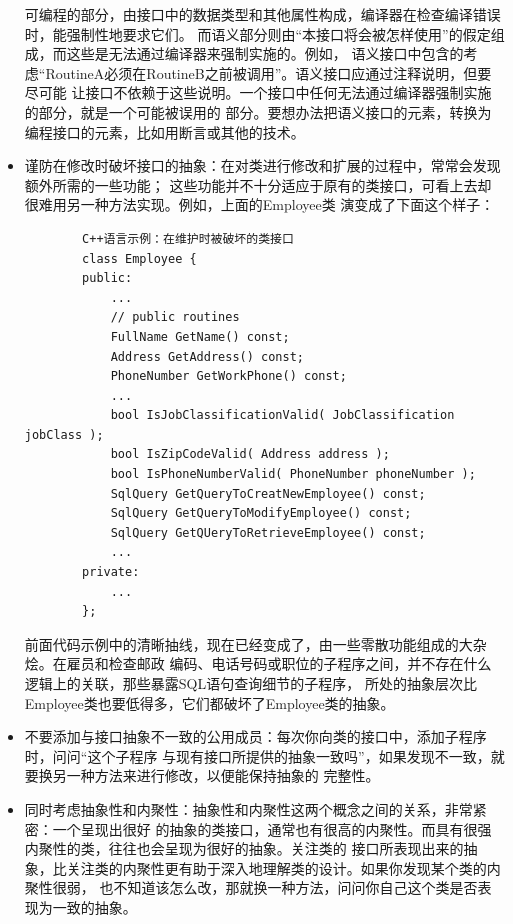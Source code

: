 \documentclass{article}
\begin{document}
\begin{itemize}
    可编程的部分，由接口中的数据类型和其他属性构成，编译器在检查编译错误时，能强制性地要求它们。
    而语义部分则由“本接口将会被怎样使用”的假定组成，而这些是无法通过编译器来强制实施的。例如，
    语义接口中包含的考虑“RoutineA必须在RoutineB之前被调用”。语义接口应通过注释说明，但要尽可能
    让接口不依赖于这些说明。一个接口中任何无法通过编译器强制实施的部分，就是一个可能被误用的
    部分。要想办法把语义接口的元素，转换为编程接口的元素，比如用断言或其他的技术。
    \item 谨防在修改时破坏接口的抽象：在对类进行修改和扩展的过程中，常常会发现额外所需的一些功能；
    这些功能并不十分适应于原有的类接口，可看上去却很难用另一种方法实现。例如，上面的Employee类
    演变成了下面这个样子：
    \begin{lstlisting}
        C++语言示例：在维护时被破坏的类接口
        class Employee {
        public:
            ...
            // public routines
            FullName GetName() const;
            Address GetAddress() const;
            PhoneNumber GetWorkPhone() const;
            ...
            bool IsJobClassificationValid( JobClassification jobClass );
            bool IsZipCodeValid( Address address );
            bool IsPhoneNumberValid( PhoneNumber phoneNumber );
            SqlQuery GetQueryToCreatNewEmployee() const;
            SqlQuery GetQueryToModifyEmployee() const;
            SqlQuery GetQUeryToRetrieveEmployee() const;
            ... 
        private:
            ...
        };
    \end{lstlisting}
    前面代码示例中的清晰抽线，现在已经变成了，由一些零散功能组成的大杂烩。在雇员和检查邮政
    编码、电话号码或职位的子程序之间，并不存在什么逻辑上的关联，那些暴露SQL语句查询细节的子程序，
    所处的抽象层次比Employee类也要低得多，它们都破坏了Employee类的抽象。
    \item 不要添加与接口抽象不一致的公用成员：每次你向类的接口中，添加子程序时，问问“这个子程序
    与现有接口所提供的抽象一致吗”，如果发现不一致，就要换另一种方法来进行修改，以便能保持抽象的
    完整性。
    \item 同时考虑抽象性和内聚性：抽象性和内聚性这两个概念之间的关系，非常紧密：一个呈现出很好
    的抽象的类接口，通常也有很高的内聚性。而具有很强内聚性的类，往往也会呈现为很好的抽象。关注类的
    接口所表现出来的抽象，比关注类的内聚性更有助于深入地理解类的设计。如果你发现某个类的内聚性很弱，
    也不知道该怎么改，那就换一种方法，问问你自己这个类是否表现为一致的抽象。
\end{itemize}
\end{document}
